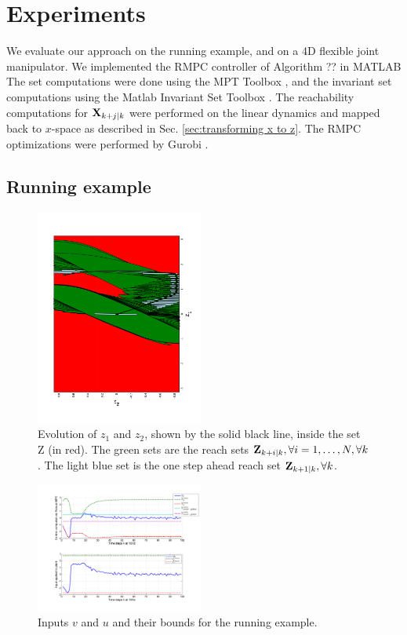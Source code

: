 \section{Experiments}
\label{sec:simulations}

We evaluate our approach on the running example, and on a 4D flexible joint manipulator.
We implemented the RMPC controller of Algorithm ?? in MATLAB
The set computations were done using the MPT Toolbox \cite{MPT3}, and the invariant set computations using the Matlab Invariant Set Toolbox \cite{IST}. 
The reachability computations for $\mathbf{X}_{k+j|k}$ were performed on the linear dynamics and mapped back to $x$-space as described in Sec. \ref{sec:transforming x to z}.
The RMPC optimizations were performed by Gurobi \cite{gurobi}.

\subsection{Running example}

\begin{figure}
\includegraphics[angle=270,width=0.49\textwidth]{figs/z_trajectory_new_2.pdf}
\caption{Evolution of $z_1$ and $z_2$, shown by the solid black line, inside the set Z (in red). The green sets are the reach sets $\mathbf{Z}_{k+i|k},\forall i=1,\dotsc,N, \forall k$. The light blue set is the one step ahead reach set $\mathbf{Z}_{k+1|k},\forall k$.}
\label{fig:z_new_toy}
\end{figure}

\begin{figure}
	\centering	
	\includegraphics[width=0.49\textwidth]{figs/u_and_v_toy.pdf}
	\caption{Inputs $v$ and $u$ and their bounds for the running example.}
	\label{fig:input toy}
\end{figure}


